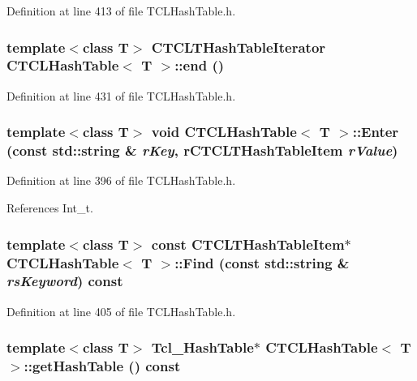 Definition at line 413 of file TCLHash\-Table.h.
\subsubsection{\setlength{\rightskip}{0pt plus 5cm}template$<$class T$>$ {\bf CTCLTHash\-Table\-Iterator} CTCLHash\-Table$<$ T $>$::end ()\hspace{0.3cm}{\tt  [inline]}}\label{classCTCLHashTable_a11}




Definition at line 431 of file TCLHash\-Table.h.
\subsubsection{\setlength{\rightskip}{0pt plus 5cm}template$<$class T$>$ void CTCLHash\-Table$<$ T $>$::Enter (const std::string \& {\em r\-Key}, {\bf r\-CTCLTHash\-Table\-Item} {\em r\-Value})\hspace{0.3cm}{\tt  [inline]}}\label{classCTCLHashTable_a7}




Definition at line 396 of file TCLHash\-Table.h.

References Int\_\-t.
\subsubsection{\setlength{\rightskip}{0pt plus 5cm}template$<$class T$>$ const {\bf CTCLTHash\-Table\-Item}$\ast$ CTCLHash\-Table$<$ T $>$::Find (const std::string \& {\em rs\-Keyword}) const\hspace{0.3cm}{\tt  [inline]}}\label{classCTCLHashTable_a8}




Definition at line 405 of file TCLHash\-Table.h.
\subsubsection{\setlength{\rightskip}{0pt plus 5cm}template$<$class T$>$ Tcl\_\-Hash\-Table$\ast$ CTCLHash\-Table$<$ T $>$::get\-Hash\-Table () const\hspace{0.3cm}{\tt  [inline]}}\label{classCTCLHashTable_a6}




